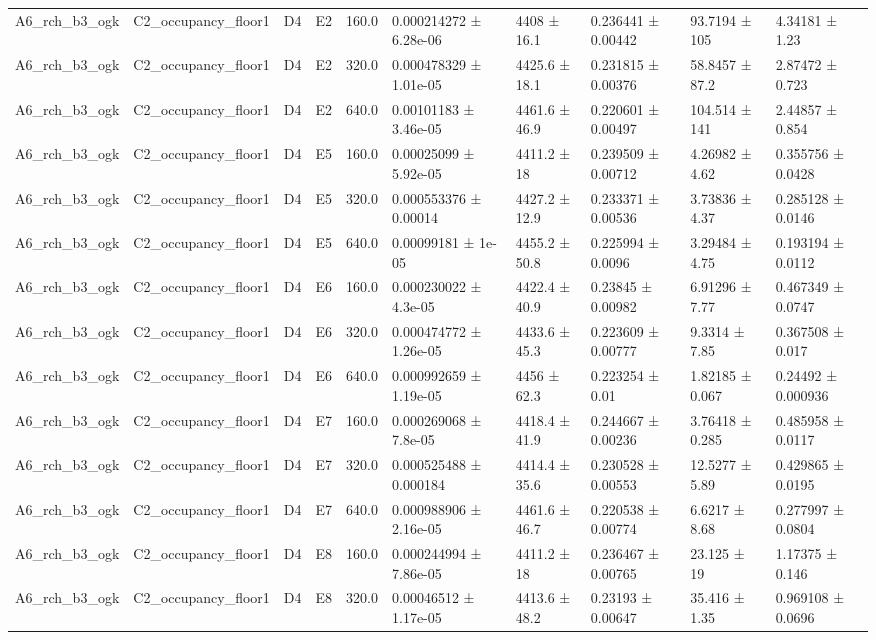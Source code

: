 \begin{table}
\begin{tabular}{llllllllll}
A6\_rch\_b3\_ogk & C2\_occupancy\_floor1 & D4 & E2 & 160.0 & 0.000214272 ± 6.28e-06 & 4408 ± 16.1 & 0.236441 ± 0.00442 & 93.7194 ± 105 & 4.34181 ± 1.23 \\
A6\_rch\_b3\_ogk & C2\_occupancy\_floor1 & D4 & E2 & 320.0 & 0.000478329 ± 1.01e-05 & 4425.6 ± 18.1 & 0.231815 ± 0.00376 & 58.8457 ± 87.2 & 2.87472 ± 0.723 \\
A6\_rch\_b3\_ogk & C2\_occupancy\_floor1 & D4 & E2 & 640.0 & 0.00101183 ± 3.46e-05 & 4461.6 ± 46.9 & 0.220601 ± 0.00497 & 104.514 ± 141 & 2.44857 ± 0.854 \\
A6\_rch\_b3\_ogk & C2\_occupancy\_floor1 & D4 & E5 & 160.0 & 0.00025099 ± 5.92e-05 & 4411.2 ± 18 & 0.239509 ± 0.00712 & 4.26982 ± 4.62 & 0.355756 ± 0.0428 \\
A6\_rch\_b3\_ogk & C2\_occupancy\_floor1 & D4 & E5 & 320.0 & 0.000553376 ± 0.00014 & 4427.2 ± 12.9 & 0.233371 ± 0.00536 & 3.73836 ± 4.37 & 0.285128 ± 0.0146 \\
A6\_rch\_b3\_ogk & C2\_occupancy\_floor1 & D4 & E5 & 640.0 & 0.00099181 ± 1e-05 & 4455.2 ± 50.8 & 0.225994 ± 0.0096 & 3.29484 ± 4.75 & 0.193194 ± 0.0112 \\
A6\_rch\_b3\_ogk & C2\_occupancy\_floor1 & D4 & E6 & 160.0 & 0.000230022 ± 4.3e-05 & 4422.4 ± 40.9 & 0.23845 ± 0.00982 & 6.91296 ± 7.77 & 0.467349 ± 0.0747 \\
A6\_rch\_b3\_ogk & C2\_occupancy\_floor1 & D4 & E6 & 320.0 & 0.000474772 ± 1.26e-05 & 4433.6 ± 45.3 & 0.223609 ± 0.00777 & 9.3314 ± 7.85 & 0.367508 ± 0.017 \\
A6\_rch\_b3\_ogk & C2\_occupancy\_floor1 & D4 & E6 & 640.0 & 0.000992659 ± 1.19e-05 & 4456 ± 62.3 & 0.223254 ± 0.01 & 1.82185 ± 0.067 & 0.24492 ± 0.000936 \\
A6\_rch\_b3\_ogk & C2\_occupancy\_floor1 & D4 & E7 & 160.0 & 0.000269068 ± 7.8e-05 & 4418.4 ± 41.9 & 0.244667 ± 0.00236 & 3.76418 ± 0.285 & 0.485958 ± 0.0117 \\
A6\_rch\_b3\_ogk & C2\_occupancy\_floor1 & D4 & E7 & 320.0 & 0.000525488 ± 0.000184 & 4414.4 ± 35.6 & 0.230528 ± 0.00553 & 12.5277 ± 5.89 & 0.429865 ± 0.0195 \\
A6\_rch\_b3\_ogk & C2\_occupancy\_floor1 & D4 & E7 & 640.0 & 0.000988906 ± 2.16e-05 & 4461.6 ± 46.7 & 0.220538 ± 0.00774 & 6.6217 ± 8.68 & 0.277997 ± 0.0804 \\
A6\_rch\_b3\_ogk & C2\_occupancy\_floor1 & D4 & E8 & 160.0 & 0.000244994 ± 7.86e-05 & 4411.2 ± 18 & 0.236467 ± 0.00765 & 23.125 ± 19 & 1.17375 ± 0.146 \\
A6\_rch\_b3\_ogk & C2\_occupancy\_floor1 & D4 & E8 & 320.0 & 0.00046512 ± 1.17e-05 & 4413.6 ± 48.2 & 0.23193 ± 0.00647 & 35.416 ± 1.35 & 0.969108 ± 0.0696 \\

\end{tabular}
\end{table}
